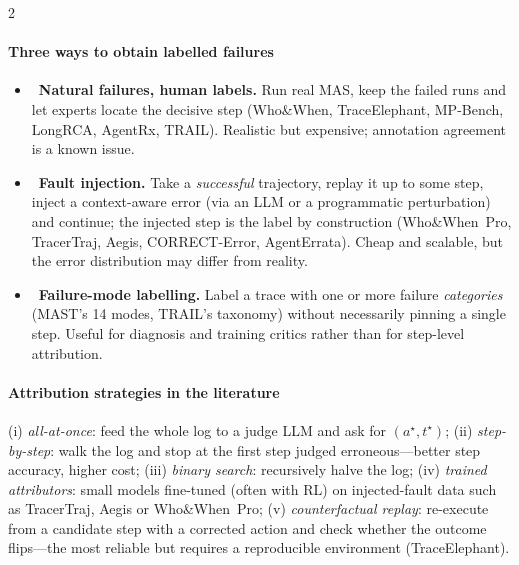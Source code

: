 \begin{multicols}{2}
\paragraph{Three ways to obtain labelled failures}
\begin{itemize}[leftmargin=1.1em]
\item \naturalbadge\ \textbf{Natural failures, human labels.} Run real MAS, keep the failed runs and let experts locate the decisive step (Who\&When, TraceElephant, MP-Bench, LongRCA, AgentRx, TRAIL). Realistic but expensive; annotation agreement is a known issue.
\item \injected\ \textbf{Fault injection.} Take a \emph{successful} trajectory, replay it up to some step, inject a context-aware error (via an LLM or a programmatic perturbation) and continue; the injected step is the label by construction (Who\&When~Pro, TracerTraj, Aegis, CORRECT-Error, AgentErrata). Cheap and scalable, but the error distribution may differ from reality.
\item {}\ \textbf{Failure-mode labelling.} Label a trace with one or more failure \emph{categories} (MAST's 14 modes, TRAIL's taxonomy) without necessarily pinning a single step. Useful for diagnosis and training critics rather than for step-level attribution.
\end{itemize}

\paragraph{Attribution strategies in the literature} (i) \emph{all-at-once}: feed the whole log to a judge LLM and ask for $(a^\star,t^\star)$; (ii) \emph{step-by-step}: walk the log and stop at the first step judged erroneous---better step accuracy, higher cost; (iii) \emph{binary search}: recursively halve the log; (iv) \emph{trained attributors}: small models fine-tuned (often with RL) on injected-fault data such as TracerTraj, Aegis or Who\&When~Pro; (v) \emph{counterfactual replay}: re-execute from a candidate step with a corrected action and check whether the outcome flips---the most reliable but requires a reproducible environment (TraceElephant).
\end{multicols}
